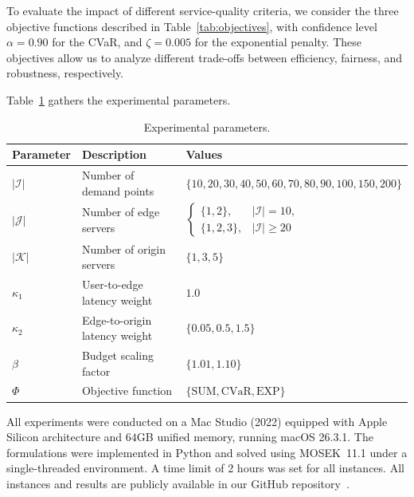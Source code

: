 \documentclass[a4paper,11pt,reqno]{amsart}
\newcommand{\K}{\mathcal{K}}
\newcommand{\I}{\mathcal{I}}
\newcommand{\J}{\mathcal{J}}
\begin{document}
To evaluate the impact of different service-quality criteria, we consider the three objective functions described in Table~\ref{tab:objectives}, with confidence level $\alpha=0.90$ for the CVaR, and $\zeta=0.005$ for the exponential penalty. These objectives allow us to analyze different trade-offs between efficiency, fairness, and robustness, respectively.

Table~\ref{tab:parameters} gathers the experimental parameters.

\renewcommand{\arraystretch}{1}
\begin{table}[htbp]
\centering
\begin{tabular}{lll}
\toprule
{\bf Parameter} & {\bf Description} & {\bf Values} \\
\midrule
$|\I|$ & Number of demand points &
$\{10,20,30,40,50,60,70,80,90,100,150, 200\}$ \\
$|\J|$ & Number of edge servers &
$
\left\{
\begin{array}{ll}
\{1,2\}, & |\I|=10,\\
\{1,2,3\}, & |\I|\geq 20
\end{array}
\right.
$\\
$|\K|$ & Number of origin servers & $\{1,3,5\}$\\
$\kappa_1$ & User-to-edge latency weight & $1.0$\\
$\kappa_2$ & Edge-to-origin latency weight & $\{0.05,0.5,1.5\}$\\
$\beta$ & Budget scaling factor & $\{1.01,1.10\}$\\
$\Phi$ & Objective function &
$\{\mathrm{SUM},\mathrm{CVaR},\mathrm{EXP}\}$\\%
\bottomrule
\end{tabular}
\caption{Experimental parameters.}
\label{tab:parameters}
\end{table}

All experiments were conducted on a Mac Studio (2022) equipped with Apple Silicon architecture and $64$GB unified memory, running macOS 26.3.1. The formulations were implemented in Python and solved using MOSEK~11.1 under a single-threaded environment. A time limit of 2 hours was set for all instances. All instances and results are publicly available in our GitHub repository~\citep{CDN2026}.
\end{document}
